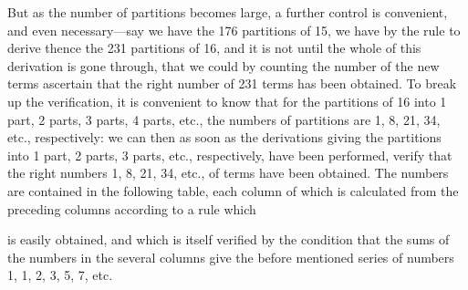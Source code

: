 \documentclass[11pt,a4paper]{article}
\begin{document}
But as the number of partitions becomes large, a further control is convenient, and even necessary---say we have the 176 partitions of 15, we have by the rule to derive thence the 231 partitions of 16, and it is not until the whole of this derivation is gone through, that we could by counting the number of the new terms ascertain that the right number of 231 terms has been obtained. To break up the verification, it is convenient to know that for the partitions of 16 into 1 part, 2 parts, 3 parts, 4 parts, etc., the numbers of partitions are 1, 8, 21, 34, etc., respectively: we can then as soon as the derivations giving the partitions into 1 part, 2 parts, 3 parts, etc., respectively, have been performed, verify that the right numbers 1, 8, 21, 34, etc., of terms have been obtained. The numbers are contained in the following table, each column of which is calculated from the preceding columns according to a rule which

\newpage
\noindent
is easily obtained, and which is itself verified by the condition that the sums of the numbers in the several columns give the before mentioned series of numbers 1, 1, 2, 3, 5, 7, etc.
\end{document}
